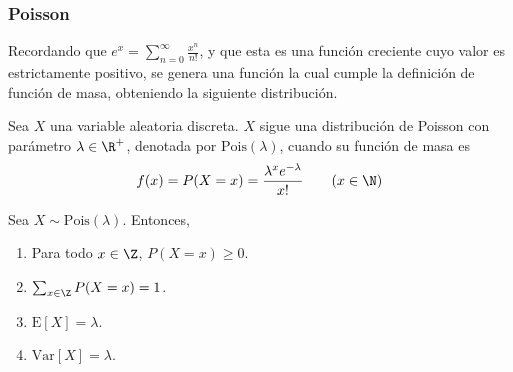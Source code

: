 \subsubsection{Poisson}
Recordando que $e^x=\sum_{n=0}^\infty\frac{x^n}{n!}$, y que esta es una función
creciente cuyo valor es estrictamente positivo, se genera una función la cual
cumple la definición de función de masa, obteniendo la siguiente distribución.
\begin{Def}
  Sea $X$ una variable aleatoria discreta. $X$ sigue una distribución
  de Poisson con parámetro $\lambda\in\R^+$, denotada por $\text{Pois}(\lambda)$,
  cuando su función de masa es
  \[f(x) = P(X=x) = \frac{\lambda^xe^{-\lambda}}{x!} \qquad (x\in\N)\]
\end{Def}
\begin{Teo}
  Sea $X\sim\text{Pois}(\lambda)$. Entonces,
  \begin{enumerate}
    \item Para todo $x\in\Z$, $P(X=x)\geq0$.
    \item $\sum_{x\in\Z}P(X=x)=1$.
    \item $\text{E}[X] = \lambda$.
    \item $\text{Var}[X]=\lambda$.
  \end{enumerate}
\end{Teo}
